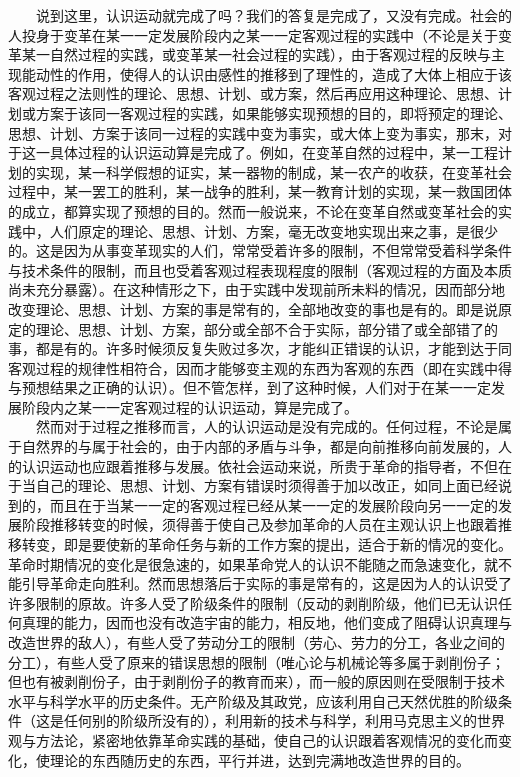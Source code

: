 \documentclass[cn,11pt,chinese]{elegantbook}
\begin{document}
　　说到这里，认识运动就完成了吗？我们的答复是完成了，又没有完成。社会的人投身于变革在某一一定发展阶段内之某一一定客观过程的实践中（不论是关于变革某一自然过程的实践，或变革某一社会过程的实践），由于客观过程的反映与主现能动性的作用，使得人的认识由感性的推移到了理性的，造成了大体上相应于该客观过程之法则性的理论、思想、计划、或方案，然后再应用这种理论、思想、计划或方案于该同一客观过程的实践，如果能够实现预想的目的，即将预定的理论、思想、计划、方案于该同一过程的实践中变为事实，或大体上变为事实，那末，对于这一具体过程的认识运动算是完成了。例如，在变革自然的过程中，某一工程计划的实现，某一科学假想的证实，某一器物的制成，某一农产的收获，在变革社会过程中，某一罢工的胜利，某一战争的胜利，某一教育计划的实现，某一救国团体的成立，都算实现了预想的目的。然而一般说来，不论在变革自然或变革社会的实践中，人们原定的理论、思想、计划、方案，毫无改变地实现出来之事，是很少的。这是因为从事变革现实的人们，常常受着许多的限制，不但常常受着科学条件与技术条件的限制，而且也受着客观过程表现程度的限制（客观过程的方面及本质尚未充分暴露）。在这种情形之下，由于实践中发现前所未料的情况，因而部分地改变理论、思想、计划、方案的事是常有的，全部地改变的事也是有的。即是说原定的理论、思想、计划、方案，部分或全部不合于实际，部分错了或全部错了的事，都是有的。许多时候须反复失败过多次，才能纠正错误的认识，才能到达于同客观过程的规律性相符合，因而才能够变主观的东西为客观的东西（即在实践中得与预想结果之正确的认识）。但不管怎样，到了这种时候，人们对于在某一一定发展阶段内之某一一定客观过程的认识运动，算是完成了。\\
　　然而对于过程之推移而言，人的认识运动是没有完成的。任何过程，不论是属于自然界的与属于社会的，由于内部的矛盾与斗争，都是向前推移向前发展的，人的认识运动也应跟着推移与发展。依社会运动来说，所贵于革命的指导者，不但在于当自己的理论、思想、计划、方案有错误时须得善于加以改正，如同上面已经说到的，而且在于当某一一定的客观过程已经从某一一定的发展阶段向另一一定的发展阶段推移转变的时候，须得善于使自己及参加革命的人员在主观认识上也跟着推移转变，即是要使新的革命任务与新的工作方案的提出，适合于新的情况的变化。革命时期情况的变化是很急速的，如果革命党人的认识不能随之而急速变化，就不能引导革命走向胜利。然而思想落后于实际的事是常有的，这是因为人的认识受了许多限制的原故。许多人受了阶级条件的限制（反动的剥削阶级，他们已无认识任何真理的能力，因而也没有改造宇宙的能力，相反地，他们变成了阻碍认识真理与改造世界的敌人），有些人受了劳动分工的限制（劳心、劳力的分工，各业之间的分工），有些人受了原来的错误思想的限制（唯心论与机械论等多属于剥削份子；但也有被剥削份子，由于剥削份子的教育而来），而一般的原因则在受限制于技术水平与科学水平的历史条件。无产阶级及其政党，应该利用自己天然优胜的阶级条件（这是任何别的阶级所没有的），利用新的技术与科学，利用马克思主义的世界观与方法论，紧密地依靠革命实践的基础，使自己的认识跟着客观情况的变化而变化，使理论的东西随历史的东西，平行并进，达到完满地改造世界的目的。\\
\end{document}

